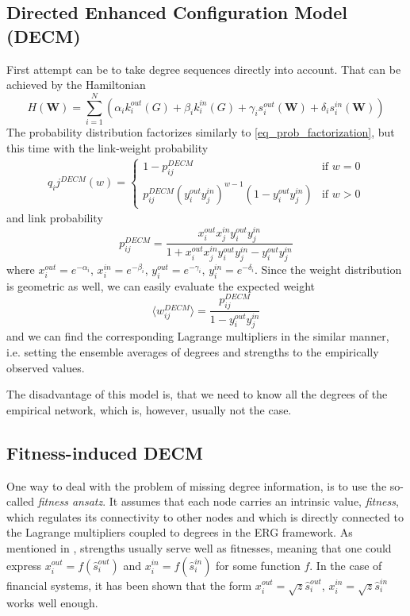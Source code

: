 \subsection{Directed Enhanced Configuration Model (DECM)}
First attempt can be to take degree sequences directly into account. That can be achieved by the Hamiltonian
\begin{equation}
    H(\textbf{W}) = \sum_{i=1}^N (\alpha_i k_i^{out}(G) + \beta_i k_i^{in}(G) + \gamma_i s_i^{out}(\textbf{W}) + \delta_i s_i^{in}(\textbf{W}))
\end{equation}
The probability distribution factorizes similarly to \ref{eq_prob_factorization}, but this time with the link-weight probability
\begin{align}
    q_ij^{DECM}(w) = \begin{cases}
        1 - p_{ij}^{DECM} \qquad &\text{if } w=0 \\
        p_{ij}^{DECM}(y_i^{out}y_j^{in})^{w-1}(1-y_i^{out}y_j^{in}) &\text{if } w>0
    \end{cases}
\end{align}
and link probability
\begin{equation}
    p_{ij}^{DECM} = \frac{x_i^{out}x_j^{in}y_i^{out}y_j^{in}}{1 + x_i^{out}x_j^{in}y_i^{out}y_j^{in} - y_i^{out}y_j^{in}}
    \label{eq_DECM_weight_prob}
\end{equation}
where $x_i^{out} = e^{-\alpha_i}$, $x_i^{in} = e^{-\beta_i}$, $y_i^{out} = e^{-\gamma_i}$, $y_i^{in} = e^{-\delta_i}$. Since the weight distribution is geometric as well, we can easily evaluate the expected weight
\begin{equation}
    \langle w_{ij}^{DECM} \rangle = \frac{p_{ij}^{DECM}}{1 - y_i^{out}y_j^{in}}
    \label{eq_DECM_average_weight}
\end{equation}
and we can find the corresponding Lagrange multipliers in the similar manner, i.e. setting the ensemble averages of degrees and strengths to the empirically observed values.

The disadvantage of this model is, that we need to know all the degrees of the empirical network, which is, however, usually not the case.

\subsection{Fitness-induced DECM}
One way to deal with the problem of missing degree information, is to use the so-called \textit{fitness ansatz}. It assumes that each node carries an intrinsic value, \textit{fitness}, which regulates its connectivity to other nodes and which is directly connected to the Lagrange multipliers coupled to degrees in the ERG framework. As mentioned in \cite{Squartini2018}, strengths usually serve well as fitnesses, meaning that one could express $x_i^{out} = f(\hat{s}_i^{out})$ and $x_i^{in} = f(\hat{s}_i^{in})$ for some function $f$. In the case of financial systems, it has been shown that the form $x_i^{out} = \sqrt{z}\hat{s}_i^{out}$, $x_i^{in} = \sqrt{z}\hat{s}_i^{in}$ works well enough. 

